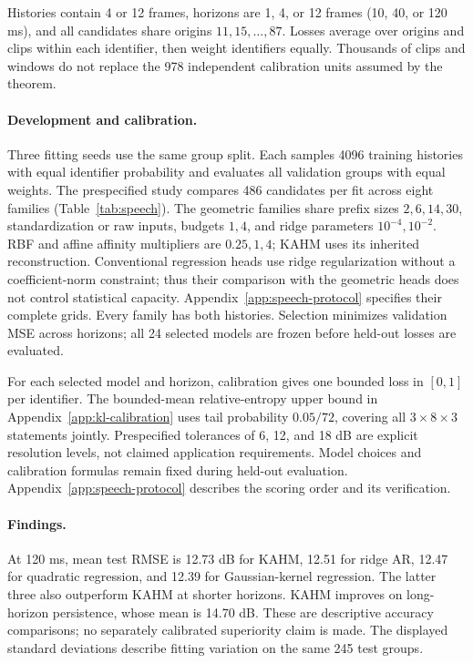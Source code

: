 Histories contain 4 or 12 frames, horizons are 1, 4, or 12 frames
(10, 40, or 120 ms), and all candidates share origins $11,15,\ldots,87$.
Losses average over origins and clips within each identifier, then weight
identifiers equally. Thousands of clips and windows do not replace the
978 independent calibration units assumed by the theorem.

\paragraph{Development and calibration.}
Three fitting seeds use the same group split. Each samples 4096 training
histories with equal identifier probability and evaluates all validation
groups with equal weights. The prespecified study compares 486 candidates per
fit across eight
families (Table~\ref{tab:speech}). The geometric families share prefix sizes
$2,6,14,30$, standardization or raw inputs, budgets $1,4$, and ridge parameters
$10^{-4},10^{-2}$. RBF and affine affinity multipliers are $0.25,1,4$;
KAHM uses its inherited reconstruction. Conventional regression heads use
ridge regularization without a coefficient-norm constraint; thus their
comparison with the geometric heads does not control statistical capacity.
Appendix~\ref{app:speech-protocol} specifies their complete grids. Every family
has both histories. Selection
minimizes validation MSE across horizons; all 24 selected models are frozen
before held-out losses are evaluated.

For each selected model and horizon, calibration gives one bounded loss in
$[0,1]$ per identifier. The bounded-mean relative-entropy upper bound in
Appendix~\ref{app:kl-calibration} uses tail probability $0.05/72$, covering
all $3\times8\times3$ statements jointly. Prespecified tolerances of
6, 12, and 18 dB are explicit resolution levels, not claimed application
requirements. Model choices and calibration formulas remain fixed during
held-out evaluation. Appendix~\ref{app:speech-protocol} describes the scoring
order and its verification.



\paragraph{Findings.}
At 120 ms, mean test RMSE is 12.73 dB for KAHM, 12.51 for ridge AR,
12.47 for quadratic regression, and 12.39 for Gaussian-kernel regression.
The latter three also outperform KAHM at shorter horizons. KAHM improves
on long-horizon persistence, whose mean is 14.70 dB. These are descriptive
accuracy comparisons; no separately calibrated superiority claim is made.
The displayed standard deviations describe fitting variation on the same
245 test groups.

